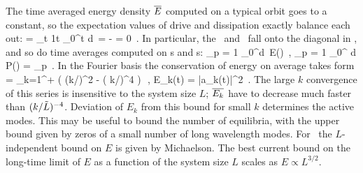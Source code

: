 The time averaged energy density  $\overline{E}$
computed on a typical orbit goes to a constant, so
the expectation values  of drive and dissipation
exactly balance each out:
\beq
      =
    \lim_{t\rightarrow \infty}
        {1\over t} \int_0^t d\tau \, \dot{\expctE}
=
       - 
= 0
    \,.
In particular, the \eqva\
and \reqva\ fall onto the diagonal in ,
and so do time averages computed on \po s and \rpo s:
\beq
{}_p =
{1\over {}} \int_0^d\tau \, E(\tau)
    \,,\qquad
{}_p =
{1\over {}} \int_0^ d\tau \, P(\tau)
    =
      _p
    \,.
\label{poE}
\eeq
In the Fourier basis  the conservation of energy on average
takes form
 = \sum_{k=1}^{+\infty} ( (k/\tildeL)^2 - ( k/\tildeL)^4 )\,
\,,\qquad
E_k(t) =  |a_k(t)|^2
\,.
The large $k$ convergence of this series is insensitive to the
system size $L$; $\overline{E_k}$ have to decrease much faster than
$(k/\tilde{L})^{-4}$.
Deviation of $E_k$ from this bound for small $k$ determines the active modes.
This may be useful to bound the number of equilibria, with
the upper bound given by zeros of a small number
of long wavelength modes.
For \eqva\ the $L$-independent bound
    on $E$ is given by Michaelson.
The best current bound on the long-time limit
of $E$
as a function of the system size $L$ scales as
$E \propto L^{3/2}$.
%
%

